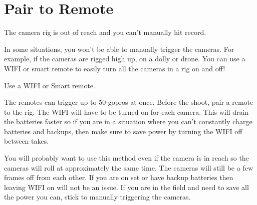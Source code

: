 \chapter{Pair to Remote}
\pagecolor{white}
\label{chap:09}
\begin{fullwidth}

\problem

{\large The camera rig is out of reach and you can’t manually hit record.  \par}

In some situations, you won’t be able to manually trigger the cameras. For example, if the cameras are rigged high up, on a dolly or drone. You can use a WIFI or smart remote to easily turn all the cameras in a rig on and off!  


\solution

{\large Use a WIFI or Smart remote. 
 \par}

The remotes can trigger up to 50 gopros at once. Before the shoot, pair a remote to the rig. The WIFI will have to be turned on for each camera. This will drain the batteries faster so if you are in a situation where you can’t constantly charge batteries and backups, then make sure to save power by turning the WIFI off between takes. 

You will probably want to use this method even if the camera is in reach so the cameras will roll at approximately the same time. The cameras will still be a few frames off from each other.  If you are on set or have backup batteries then leaving WIFI on will not be an issue. If you are in the field and need to save all the power you can, stick to manually triggering the cameras. 




\clearpage
\end{fullwidth}
